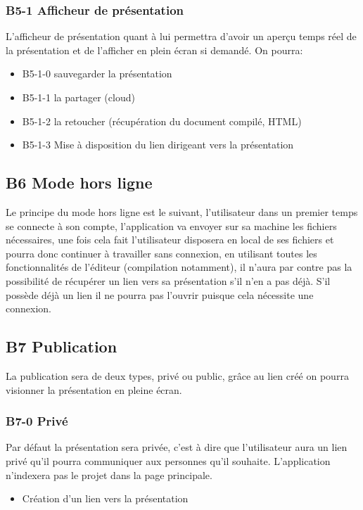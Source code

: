 \documentclass[11pt,a4paper]{article}
\begin{document}
\subsubsection{B5-1 Afficheur de présentation}
L'afficheur de présentation quant à lui permettra d'avoir un aperçu temps réel de la présentation et de l'afficher en plein écran si demandé. On pourra:
\begin{itemize}
\item B5-1-0 sauvegarder la présentation
\item B5-1-1 la partager (cloud)
\item B5-1-2 la retoucher (récupération du document compilé, HTML)
\item B5-1-3 Mise à disposition du lien dirigeant vers la présentation
\end{itemize} 

\subsection{B6 Mode hors ligne}
Le principe du mode hors ligne est le suivant, l'utilisateur dans un premier temps se connecte à son compte, l'application va envoyer sur sa machine les fichiers nécessaires, une fois cela fait l'utilisateur disposera en local de ses fichiers et pourra donc continuer à travailler sans connexion, en utilisant toutes les fonctionnalités de l'éditeur (compilation notamment), il n'aura par contre pas la possibilité de récupérer un lien vers sa présentation s'il n'en a pas déjà. S'il possède déjà un lien il ne pourra pas l'ouvrir puisque cela nécessite une connexion.

\subsection{B7 Publication}
La publication sera de deux types, privé ou public, grâce au lien créé on pourra visionner la présentation en pleine écran.

\subsubsection{B7-0 Privé}
Par défaut la présentation sera privée, c'est à dire que l'utilisateur aura un lien privé qu'il pourra communiquer aux personnes qu'il souhaite. L'application n'indexera pas le projet dans la page principale.
\begin{itemize}
\item Création d'un lien vers la présentation
\end{itemize}
\end{document}
